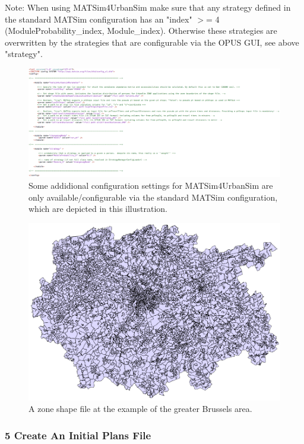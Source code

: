 Note: When using MATSim4UrbanSim  make sure that any strategy defined in the standard MATSim  configuration has an "index" $>$= 4 (ModuleProbability\_index,  Module\_index). Otherwise these strategies are overwritten by the  strategies that are configurable via the OPUS GUI, see above "strategy".

\begin{figure}[htp]
\includegraphics[width=\textwidth]{figures/matsim4urbansim/external_matsim_config_1.png}
\caption{Some addidional configuration settings for MATSim4UrbanSim  are only available/configurable via the standard MATSim configuration,  which are depicted in this illustration.}
\end{figure}

\begin{figure}[htp]
\includegraphics[width=\textwidth]{figures/matsim4urbansim/brussel_zone_shapefile.png}
\caption{A zone shape file at the example of the greater Brussels area.}
\end{figure}

\subsubsection{5 Create An Initial Plans File}

